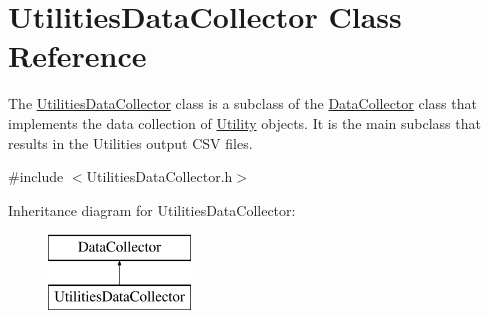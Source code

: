 \hypertarget{classUtilitiesDataCollector}{}\section{Utilities\+Data\+Collector Class Reference}
\label{classUtilitiesDataCollector}


The {\ttfamily \mbox{\hyperlink{classUtilitiesDataCollector}{Utilities\+Data\+Collector}}} class is a subclass of the {\ttfamily \mbox{\hyperlink{classDataCollector}{Data\+Collector}}} class that implements the data collection of \mbox{\hyperlink{classUtility}{Utility}} objects. It is the main subclass that results in the Utilities\textquotesingle{} output C\+SV files.  




{\ttfamily \#include $<$Utilities\+Data\+Collector.\+h$>$}

Inheritance diagram for Utilities\+Data\+Collector\+:\begin{figure}[H]
\begin{center}
\leavevmode
\includegraphics[height=2.000000cm]{classUtilitiesDataCollector}
\end{center}
\end{figure}
